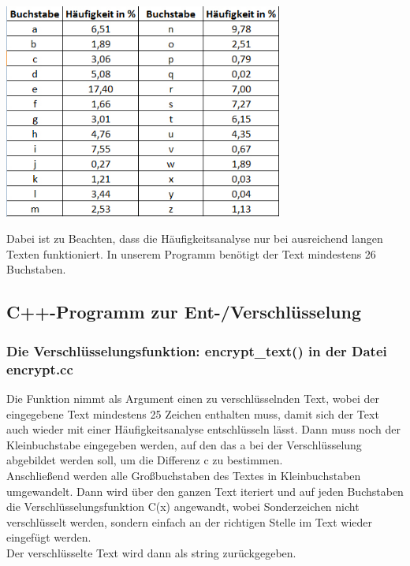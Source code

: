 \documentclass[ngerman,12pt]{article}
\begin{document}
\begin{center}
\includegraphics[width=260pt,height=200pt]{buchstaben-haeufigkeit-deutsches-alphabet.jpg}
\end{center}

Dabei ist zu Beachten, dass die Häufigkeitsanalyse nur bei ausreichend langen Texten funktioniert. In unserem Programm benötigt der Text mindestens 26 Buchstaben.

\newpage

\subsection*{C++-Programm zur Ent-/Verschlüsselung}

\subsubsection*{Die Verschlüsselungsfunktion: encrypt\_text() in der Datei encrypt.cc}

Die Funktion nimmt als Argument einen zu verschlüsselnden Text, wobei der eingegebene Text mindestens 25 Zeichen enthalten muss, damit sich der Text auch wieder mit einer Häufigkeitsanalyse entschlüsseln lässt. Dann muss noch der Kleinbuchstabe eingegeben werden, auf den das a bei der Verschlüsselung abgebildet werden soll, um die Differenz c zu bestimmen. \\
Anschließend werden alle Großbuchstaben des Textes in Kleinbuchstaben umgewandelt. Dann wird über den ganzen Text iteriert und auf jeden Buchstaben die Verschlüsselungsfunktion C(x) angewandt, wobei Sonderzeichen nicht verschlüsselt werden, sondern einfach an der richtigen Stelle im Text wieder eingefügt werden. \\
Der verschlüsselte Text wird dann als string zurückgegeben.
\end{document}
